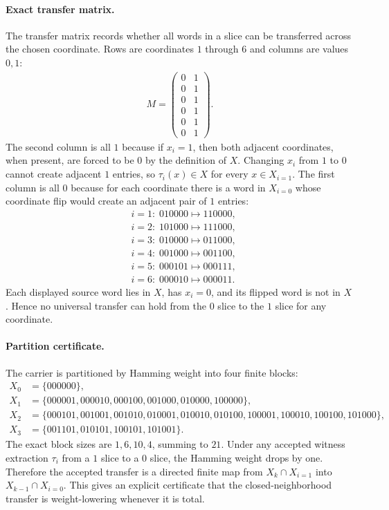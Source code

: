 \paragraph{Exact transfer matrix.}
The transfer matrix records whether all words in a slice can be transferred across the chosen coordinate.  Rows are coordinates $1$ through $6$ and columns are values $0,1$:
$$
\begin{aligned}
M=\begin{pmatrix}
0&1\\
0&1\\
0&1\\
0&1\\
0&1\\
0&1
\end{pmatrix}.
\end{aligned}
$$
The second column is all $1$ because if $x_i=1$, then both adjacent coordinates, when present, are forced to be $0$ by the definition of $X$.  Changing $x_i$ from $1$ to $0$ cannot create adjacent $1$ entries, so $\tau_i(x)\in X$ for every $x\in X_{i=1}$.  The first column is all $0$ because for each coordinate there is a word in $X_{i=0}$ whose coordinate flip would create an adjacent pair of $1$ entries:
$$
\begin{aligned}
&i=1:\;010000\mapsto 110000,\\
&i=2:\;101000\mapsto 111000,\\
&i=3:\;010000\mapsto 011000,\\
&i=4:\;001000\mapsto 001100,\\
&i=5:\;000101\mapsto 000111,\\
&i=6:\;000010\mapsto 000011.
\end{aligned}
$$
Each displayed source word lies in $X$, has $x_i=0$, and its flipped word is not in $X$.  Hence no universal transfer can hold from the $0$ slice to the $1$ slice for any coordinate.

\paragraph{Partition certificate.}
The carrier is partitioned by Hamming weight into four finite blocks:
$$
\begin{aligned}
X_0&=\{000000\},\\
X_1&=\{000001,000010,000100,001000,010000,100000\},\\
X_2&=\{000101,001001,001010,010001,010010,010100,100001,100010,100100,101000\},\\
X_3&=\{001101,010101,100101,101001\}.
\end{aligned}
$$
The exact block sizes are $1,6,10,4$, summing to $21$.  Under any accepted witness extraction $\tau_i$ from a $1$ slice to a $0$ slice, the Hamming weight drops by one.  Therefore the accepted transfer is a directed finite map from $X_k\cap X_{i=1}$ into $X_{k-1}\cap X_{i=0}$.  This gives an explicit certificate that the closed-neighborhood transfer is weight-lowering whenever it is total.


